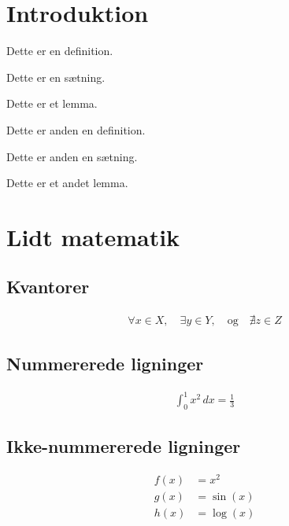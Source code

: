 
\section{Introduktion}

\begin{defn}
Dette er en definition.
\end{defn}

\begin{thm}
Dette er en sætning.
\end{thm}

\begin{lemma}
Dette er et lemma.
\end{lemma}

\begin{defn}
Dette er anden en definition.
\end{defn}

\begin{thm}
Dette er anden en sætning.
\end{thm}

\begin{lemma}
Dette er et andet lemma.
\end{lemma}

\section{Lidt matematik}

\subsection{Kvantorer}
\begin{align*}
\forall x \in X, \quad \exists y \in Y, \quad \text{og} \quad \nexists z \in Z
\end{align*}

\subsection{Nummererede ligninger}
\begin{align}
\int_0^1 x^2 \, dx = \frac{1}{3}
\end{align}

\subsection{Ikke-nummererede ligninger}
\begin{align*}
f(x) &= x^2 \\
g(x) &= \sin(x) \\
h(x) &= \log(x)
\end{align*}


